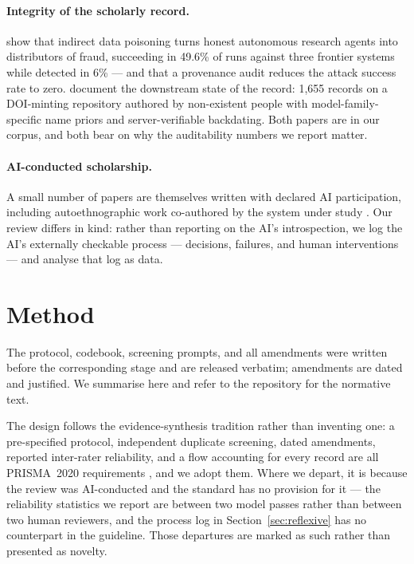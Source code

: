 \paragraph{Integrity of the scholarly record.} \citet{gyevnar2026ddos} show that indirect data
poisoning turns honest autonomous research agents into distributors of fraud, succeeding in
49.6\% of runs against three frontier systems while detected in 6\% --- and that a provenance
audit reduces the attack success rate to zero. \citet{brzozowski2026ghost} document the
downstream state of the record: 1{,}655 records on a DOI-minting repository authored by
non-existent people with model-family-specific name priors and server-verifiable backdating.
Both papers are in our corpus, and both bear on why the auditability numbers we report matter.

\paragraph{AI-conducted scholarship.} A small number of papers are themselves written with
declared AI participation, including autoethnographic work co-authored by the system under
study \citep{ying2026stratigraphy}. Our review differs in kind: rather than reporting on the
AI's introspection, we log the AI's externally checkable process --- decisions, failures,
and human interventions --- and analyse that log as data.

\section{Method}
\label{sec:method}

The protocol, codebook, screening prompts, and all amendments were written before the
corresponding stage and are released verbatim; amendments are dated and justified. We
summarise here and refer to the repository for the normative text.

The design follows the evidence-synthesis tradition rather than inventing one: a
pre-specified protocol, independent duplicate screening, dated amendments, reported
inter-rater reliability, and a flow accounting for every record are all PRISMA~2020
requirements \citep{page2021prisma}, and we adopt them. Where we depart, it is because the
review was AI-conducted and the standard has no provision for it --- the reliability
statistics we report are between two model passes rather than between two human reviewers,
and the process log in Section~\ref{sec:reflexive} has no counterpart in the guideline. Those
departures are marked as such rather than presented as novelty.

